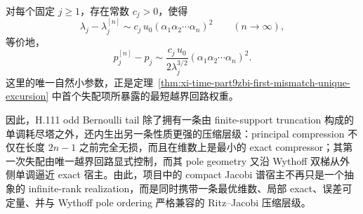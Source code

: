 \begin{conjecture}\label{conj:xi-time-part9zbi-ritz-error-unique-excursion}
对每个固定 \(j\ge 1\)，存在常数 \(c_j>0\)，使得
\[
\lambda_j-\lambda_j^{[n]}
\sim
c_j\,u_0(\alpha_1\alpha_2\cdots\alpha_n)^2
\qquad (n\to\infty),
\]
等价地，
\[
p_j^{[n]}-p_j
\sim
\frac{c_j\,u_0}{2\lambda_j^{3/2}}
(\alpha_1\alpha_2\cdots\alpha_n)^2.
\]
这里的唯一自然小参数，正是定理~\ref{thm:xi-time-part9zbi-first-mismatch-unique-excursion} 中首个失配项所暴露的最短越界回路权重。
\end{conjecture}

\noindent
因此，H.111 odd Bernoulli tail 除了拥有一条由 finite-support truncation 构成的单调耗尽塔之外，还内生出另一条性质更强的压缩层级：principal compression 不仅在长度 \(2n-1\) 之前完全无损，而且在维数上是最小的 exact compressor；其第一次失配由唯一越界回路显式控制，而其 pole geometry 又沿 Wythoff 双梯从外侧单调逼近 exact 宿主。由此，项目中的 compact Jacobi 谱宿主不再只是一个抽象的 infinite-rank realization，而是同时携带一条最优维数、局部 exact、误差可定量、并与 Wythoff pole ordering 严格兼容的 Ritz--Jacobi 压缩层级。

\endinput
